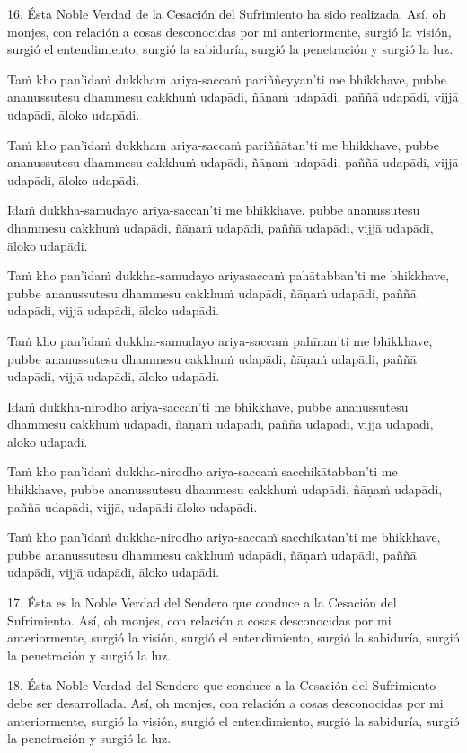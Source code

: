16. Ésta Noble Verdad de la Cesación del Sufrimiento ha sido realizada. Así, oh monjes, con relación a cosas desconocidas por mi anteriormente, surgió la visión, surgió el entendimiento, surgió la sabiduría, surgió la penetración y surgió la luz.

\clearpage

\paliText
\markboth{\paliTitle}{\rightmark}

Taṁ kho pan'idaṁ dukkhaṁ ariya-saccaṁ pariññeyyan'ti me bhikkhave, pubbe
ananussutesu dhammesu cakkhuṁ udapādi, ñāṇaṁ udapādi, paññā udapādi,
vijjā udapādi, āloko udapādi.

Taṁ kho pan'idaṁ dukkhaṁ ariya-saccaṁ pariññātan'ti me bhikkhave, pubbe
ananussutesu dhammesu cakkhuṁ udapādi, ñāṇaṁ udapādi, paññā udapādi,
vijjā udapādi, āloko udapādi.

Idaṁ dukkha-samudayo ariya-saccan'ti me bhikkhave, pubbe ananussutesu
dhammesu cakkhuṁ udapādi, ñāṇaṁ udapādi, paññā udapādi, vijjā udapādi,
āloko udapādi.

Taṁ kho pan'idaṁ dukkha-samudayo ariyasaccaṁ pahātabban'ti me bhikkhave,
pubbe ananussutesu dhammesu cakkhuṁ udapādi, ñāṇaṁ udapādi, paññā
udapādi, vijjā udapādi, āloko udapādi.

Taṁ kho pan'idaṁ dukkha-samudayo ariya-saccaṁ pahīnan'ti me bhikkhave, pubbe
ananussutesu dhammesu cakkhuṁ udapādi, ñāṇaṁ udapādi, paññā udapādi,
vijjā udapādi, āloko udapādi.

Idaṁ dukkha-nirodho ariya-saccan'ti me bhikkhave, pubbe ananussutesu
dhammesu cakkhuṁ udapādi, ñāṇaṁ udapādi, paññā udapādi, vijjā udapādi,
āloko udapādi.

Taṁ kho pan'idaṁ dukkha-nirodho ariya-saccaṁ sacchikātabban'ti me bhikkhave,
pubbe ananussutesu dhammesu cakkhuṁ udapādi, ñāṇaṁ udapādi, paññā
udapādi, vijjā, udapādi āloko udapādi.

Taṁ kho pan'idaṁ dukkha-nirodho ariya-saccaṁ sacchikatan'ti me bhikkhave,
pubbe ananussutesu dhammesu cakkhuṁ udapādi, ñāṇaṁ udapādi, paññā
udapādi, vijjā udapādi, āloko udapādi.

\clearpage

\englishText
\markboth{\englishTitle}{\rightmark}
17. Ésta es la Noble Verdad del Sendero que conduce a la Cesación del Sufrimiento. Así, oh monjes, con relación a cosas desconocidas por mi anteriormente, surgió la visión, surgió el entendimiento, surgió la sabiduría, surgió la penetración y surgió la luz.

18. Ésta Noble Verdad del Sendero que conduce a la Cesación del Sufrimiento debe ser desarrollada. Así, oh monjes, con relación a cosas desconocidas por mi anteriormente, surgió la visión, surgió el entendimiento, surgió la sabiduría, surgió la penetración y surgió la luz.

